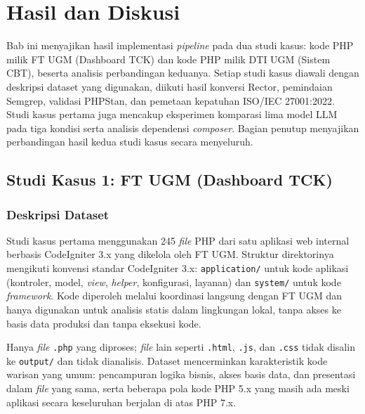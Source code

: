 \chapter{Hasil dan Diskusi}

Bab ini menyajikan hasil implementasi \textit{pipeline} pada dua studi 
kasus: kode PHP milik FT UGM (Dashboard TCK) dan kode PHP milik DTI UGM 
(Sistem CBT), beserta analisis perbandingan keduanya. Setiap studi kasus 
diawali dengan deskripsi dataset yang digunakan, diikuti hasil konversi 
Rector, pemindaian Semgrep, validasi PHPStan, dan pemetaan kepatuhan 
ISO/IEC 27001:2022. Studi kasus pertama juga mencakup eksperimen komparasi 
lima model LLM pada tiga kondisi serta analisis dependensi \textit{composer}. 
Bagian penutup menyajikan perbandingan hasil kedua studi kasus secara 
menyeluruh.

\section{Studi Kasus 1: FT UGM (Dashboard TCK)}

\subsection{Deskripsi Dataset}

Studi kasus pertama menggunakan 245 \textit{file} PHP dari satu aplikasi 
web internal berbasis CodeIgniter 3.x yang dikelola oleh FT UGM. 
Struktur direktorinya mengikuti konvensi standar CodeIgniter 3.x: 
\texttt{application/} untuk kode aplikasi (kontroler, model, \textit{view}, 
\textit{helper}, konfigurasi, layanan) dan \texttt{system/} untuk kode 
\textit{framework}. Kode diperoleh melalui koordinasi langsung dengan 
FT UGM dan hanya digunakan untuk analisis statis dalam lingkungan lokal, 
tanpa akses ke basis data produksi dan tanpa eksekusi kode.

Hanya \textit{file} \texttt{.php} yang diproses; \textit{file} lain 
seperti \texttt{.html}, \texttt{.js}, dan \texttt{.css} tidak disalin 
ke \texttt{output/} dan tidak dianalisis. Dataset mencerminkan 
karakteristik kode warisan yang umum: pencampuran logika bisnis, akses 
basis data, dan presentasi dalam \textit{file} yang sama, serta beberapa 
pola kode PHP 5.x yang masih ada meski aplikasi secara keseluruhan 
berjalan di atas PHP 7.x.

